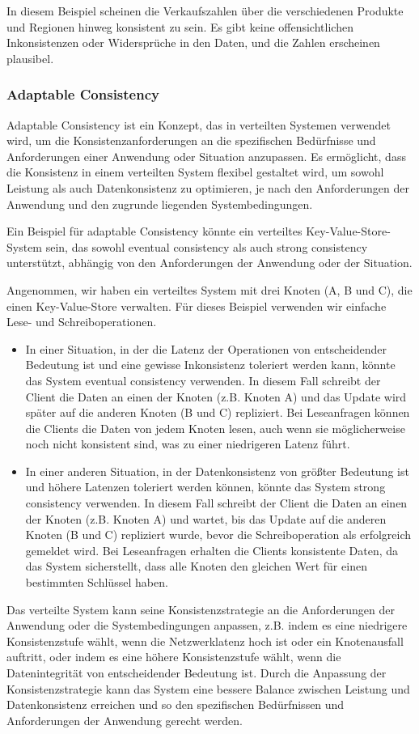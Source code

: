 In diesem Beispiel scheinen die Verkaufszahlen über die verschiedenen Produkte und Regionen hinweg konsistent zu sein. Es gibt keine offensichtlichen Inkonsistenzen oder Widersprüche in den Daten, und die Zahlen erscheinen plausibel. 

\subsubsection{Adaptable Consistency}

Adaptable Consistency ist ein Konzept, das in verteilten Systemen verwendet wird, um die Konsistenzanforderungen an die spezifischen Bedürfnisse und Anforderungen einer Anwendung oder Situation anzupassen. Es ermöglicht, dass die Konsistenz in einem verteilten System flexibel gestaltet wird, um sowohl Leistung als auch Datenkonsistenz zu optimieren, je nach den Anforderungen der Anwendung und den zugrunde liegenden Systembedingungen.

Ein  Beispiel für adaptable Consistency könnte ein verteiltes Key-Value-Store-System sein, das sowohl eventual consistency als auch strong consistency unterstützt, abhängig von den Anforderungen der Anwendung oder der Situation.

Angenommen, wir haben ein verteiltes System mit drei Knoten (A, B und C), die einen Key-Value-Store verwalten. Für dieses Beispiel verwenden wir einfache Lese- und Schreiboperationen.
\begin{itemize}
\item In einer Situation, in der die Latenz der Operationen von entscheidender Bedeutung ist und eine gewisse Inkonsistenz toleriert werden kann, könnte das System eventual consistency verwenden. In diesem Fall schreibt der Client die Daten an einen der Knoten (z.B. Knoten A) und das Update wird später auf die anderen Knoten (B und C) repliziert. Bei Leseanfragen können die Clients die Daten von jedem Knoten lesen, auch wenn sie möglicherweise noch nicht konsistent sind, was zu einer niedrigeren Latenz führt.
\item In einer anderen Situation, in der Datenkonsistenz von größter Bedeutung ist und höhere Latenzen toleriert werden können, könnte das System strong consistency verwenden. In diesem Fall schreibt der Client die Daten an einen der Knoten (z.B. Knoten A) und wartet, bis das Update auf die anderen Knoten (B und C) repliziert wurde, bevor die Schreiboperation als erfolgreich gemeldet wird. Bei Leseanfragen erhalten die Clients konsistente Daten, da das System sicherstellt, dass alle Knoten den gleichen Wert für einen bestimmten Schlüssel haben.
\end{itemize}
Das verteilte System kann seine Konsistenzstrategie an die Anforderungen der Anwendung oder die Systembedingungen anpassen, z.B. indem es eine niedrigere Konsistenzstufe wählt, wenn die Netzwerklatenz hoch ist oder ein Knotenausfall auftritt, oder indem es eine höhere Konsistenzstufe wählt, wenn die Datenintegrität von entscheidender Bedeutung ist. Durch die Anpassung der Konsistenzstrategie kann das System eine bessere Balance zwischen Leistung und Datenkonsistenz erreichen und so den spezifischen Bedürfnissen und Anforderungen der Anwendung gerecht werden.

